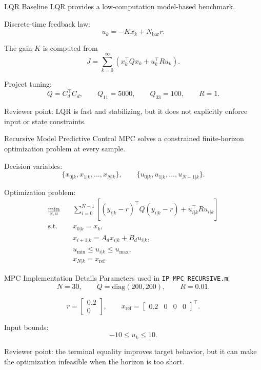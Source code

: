 \documentclass[aspectratio=169,11pt]{beamer}
\begin{document}
\begin{frame}{LQR Baseline}
    LQR provides a low-computation model-based benchmark.

    \vspace{0.3cm}
    Discrete-time feedback law:
    \[
    u_k = -Kx_k + N_{\mathrm{bar}}r.
    \]

    \vspace{0.3cm}
    The gain $K$ is computed from
    \[
    J = \sum_{k=0}^{\infty}
    \left(x_k^{\top}Qx_k + u_k^{\top}Ru_k\right).
    \]

    \vspace{0.3cm}
    Project tuning:
    \[
    Q=C_d^{\top}C_d,\qquad Q_{11}=5000,\qquad Q_{33}=100,\qquad R=1.
    \]

    \vspace{0.3cm}
    Reviewer point: LQR is fast and stabilizing, but it does not explicitly enforce input or state constraints.
\end{frame}

\begin{frame}{Recursive Model Predictive Control}
    MPC solves a constrained finite-horizon optimization problem at every sample.

    \vspace{0.2cm}
    Decision variables:
    \[
    \{x_{0|k},x_{1|k},\ldots,x_{N|k}\},
    \qquad
    \{u_{0|k},u_{1|k},\ldots,u_{N-1|k}\}.
    \]

    \vspace{0.2cm}
    Optimization problem:
    \[
    \begin{aligned}
    \min_{x,u}\quad
    &\sum_{i=0}^{N-1}
    \left[
    (y_{i|k}-r)^{\top}Q(y_{i|k}-r)
    +u_{i|k}^{\top}Ru_{i|k}
    \right] \\
    \mathrm{s.t.}\quad
    &x_{0|k}=x_k,\\
    &x_{i+1|k}=A_d x_{i|k}+B_d u_{i|k},\\
    &u_{\min}\leq u_{i|k}\leq u_{\max},\\
    &x_{N|k}=x_{\mathrm{ref}}.
    \end{aligned}
    \]
\end{frame}

\begin{frame}{MPC Implementation Details}
    Parameters used in \texttt{IP\_MPC\_RECURSIVE.m}:
    \[
    N=30,\qquad Q=\mathrm{diag}(200,200),\qquad R=0.01.
    \]

    \[
    r =
    \begin{bmatrix}
    0.2\\0
    \end{bmatrix},
    \qquad
    x_{\mathrm{ref}} =
    \begin{bmatrix}
    0.2&0&0&0
    \end{bmatrix}^{\top}.
    \]

    \vspace{0.3cm}
    Input bounds:
    \[
    -10 \leq u_k \leq 10.
    \]

    \vspace{0.3cm}
    Reviewer point: the terminal equality improves target behavior, but it can make the optimization infeasible when the horizon is too short.
\end{frame}
\end{document}
